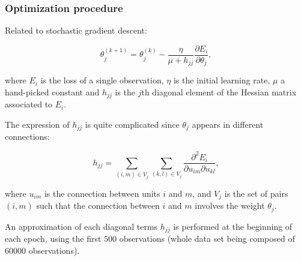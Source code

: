 \begin{frame}
	\frametitle{Optimization procedure}
	
	
	
Related to stochastic gradient descent:

	$$
	\theta^{(k+1)}_j = \theta^{(k)}_j - \frac{\eta}{\mu + h_{jj}} \frac{\partial E_i}{\partial \theta_j},
	$$
	
	\smallskip
	where $E_i$ is the loss of a single observation, $\eta$ is the initial learning rate, $\mu$ a hand-picked constant and $h_{jj}$ is the $j$th diagonal element of the Hessian matrix associated to $E_i$. 
	
	\bigskip
	
	The expression of $h_{jj}$ is quite complicated since $\theta_j$ appears in different connections: 
	
	$$
	h_{jj} = \sum_{(i,m) \in V_j} \sum_{(k,l) \in V_j} \frac{\partial^2 E_i}{\partial u_{im} \partial u_{k l}},
	$$
	
	\smallskip
	where $u_{im}$ is the connection between units $i$ and $m$, and $V_j$ is the set of pairs $(i,m)$ such that the connection between $i$ and $m$ involves the weight $\theta_j$.
	
	\bigskip
	
	An approximation of each diagonal terms $h_{jj}$ is performed at the beginning of each epoch, using the first $500$ observations (whole data set being composed of $60000$ observations).
	
	\end{frame}

